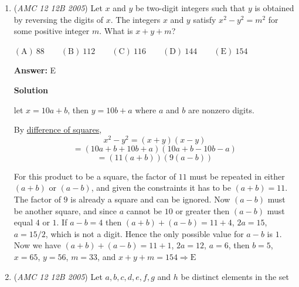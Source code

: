 \begin{enumerate}
 For angle $A$ and $B$ to be acute, $C$ must be between the two lines that are perpendicular to $\overline{AB}$ and contain points $A$ and $B$. For angle $C$ to be acute, first draw a $45-45-90$ triangle with $\overline{AB}$ as the hypotenuse. Note $C$ cannot be inside this triangle's circumscribed circle or else $\angle C > 90^\circ$. Hence, the area of $R$ is the area of the large triangle minus the area of the small triangle minus the area of the circle, which is $\frac{14^2}{2}-\frac{4^2}{2}-(\frac{5\sqrt{2}}{2})^2\pi=98-8-\frac{25\pi}{2}$, which is approximately $51$. The answer is $\boxed{\mathrm{C}}$.

 Note: When doing this problem, it is important to double check that the circle with diameter $AB$ lies fully in the first quadrant, which luckily it does.

 


	\item (\textit{AMC 12 12B 2005}) Let $x$ and $y$ be two-digit integers such that $y$ is obtained by reversing the digits of $x$. The integers $x$ and $y$ satisfy $x^{2}-y^{2}=m^{2}$ for some positive integer $m$. What is $x+y+m$?


 $\mathrm{(A)}\ 88    \qquad \mathrm{(B)}\ 112   \qquad \mathrm{(C)}\ 116   \qquad \mathrm{(D)}\ 144   \qquad \mathrm{(E)}\ 154   \qquad$

 \textbf{Answer: }E



\textbf{Solution}

let $x=10a+b$, then $y=10b+a$ where $a$ and $b$ are nonzero digits.

 By \href{https://artofproblemsolving.com/wiki/index.php?title=Difference\_of\_squares}{difference of squares},
 \[x^2-y^2=(x+y)(x-y)\]
 \[=(10a+b+10b+a)(10a+b-10b-a)\]
 \[=(11(a+b))(9(a-b))\]

 For this product to be a square, the factor of $11$ must be repeated in either $(a+b)$ or $(a-b)$, and given the constraints it has to be $(a+b)=11$. The factor of $9$ is already a square and can be ignored. Now $(a-b)$ must be another square, and since $a$ cannot be $10$ or greater then $(a-b)$ must equal $4$ or $1$. If $a-b=4$ then $(a+b)+(a-b)=11+4$, $2a=15$, $a=15/2$, which is not a digit. Hence the only possible value for $a-b$ is $1$. Now we have $(a+b)+(a-b)=11+1$, $2a=12$, $a=6$, then $b=5$, $x=65$, $y=56$, $m=33$, and $x+y+m=154\Rightarrow\boxed{\mathrm{E}}$



	\item (\textit{AMC 12 12B 2005}) Let $a,b,c,d,e,f,g$ and $h$ be distinct elements in the set



\end{enumerate}
